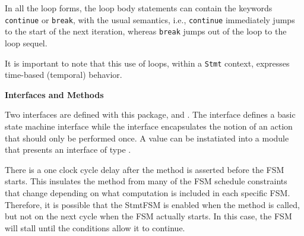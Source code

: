 In all the loop forms, the loop body statements can contain the
keywords \texttt{continue} or \texttt{break}, with the usual semantics,
i.e., \texttt{continue} immediately jumps to the start of the next
iteration, whereas \texttt{break} jumps out of the loop to the loop
sequel.

It is important to note that this use of loops, within a \texttt{Stmt}
context, expresses time-based (temporal) behavior. %







{\bf Interfaces and Methods}

Two interfaces are defined with this package,  and .
The  interface defines a basic state machine interface while the 
interface encapsulates the notion of an action that should only be
performed once.  A  value can be instatiated into a module
that presents an interface of type .

There is a one clock cycle delay after the  method is
asserted before the FSM starts.  This insulates the  method
from many of the FSM schedule constraints that change depending on what
computation is included in each specific FSM. 
Therefore, it is possible that the StmtFSM is enabled  when the
 method  is called, but not on the next cycle when the FSM
actually starts.  In this case, the FSM will stall until the
conditions allow it to continue.




